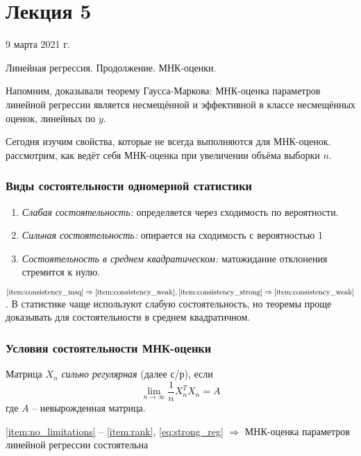 \documentclass[main.tex]{subfiles}
\begin{document}
\section{Лекция 5}
9 марта 2021 г.

Линейная регрессия. Продолжение. МНК-оценки.

Напомним, доказывали теорему Гаусса-Маркова: МНК-оценка параметров линейной регрессии является несмещённой и эффективной в классе несмещённых оценок, линейных по $y$.

Сегодня изучим свойства, которые не всегда выполняются для МНК-оценок.
рассмотрим, как ведёт себя МНК-оценка при увеличении объёма выборки $n$.

\subsubsection{Виды состоятельности одномерной статистики}

\begin{enumerate}[noitemsep]
    \item \emph{Слабая состоятельность:} определяется через сходимость по вероятности. \label{item:consistency_weak}
    \item \emph{Сильная состоятельность:} опирается на сходимость с вероятностью 1 \label{item:consistency_strong}
    \item \emph{Состоятельность в среднем квадратическом:} матожидание отклонения стремится к нулю. \label{item:consistency_msq}
\end{enumerate}

$ \ref{item:consistency_msq} \Rightarrow \ref{item:consistency_weak}, \ref{item:consistency_strong} \Rightarrow \ref{item:consistency_weak} $.
В статистике чаще используют слабую состоятельность, но теоремы проще доказывать для состоятельности в среднем квадратичном.

\subsubsection{Условия состоятельности МНК-оценки}

Матрица $ X_n $ \emph{сильно регулярная} (далее с/р), если
\begin{equation} \label{eq:strong_reg}
    \lim\limits_{n \to \infty} \frac{1}{n} X_n^T X_n = A
\end{equation}
где $ A $ -- невырожденная матрица.

\begin{theorem}
    \ref{item:no_limitations} -- \ref{item:rank}, \eqref{eq:strong_reg} $\Rightarrow$ МНК-оценка параметров линейной регрессии состоятельна
\end{theorem}
\end{document}
